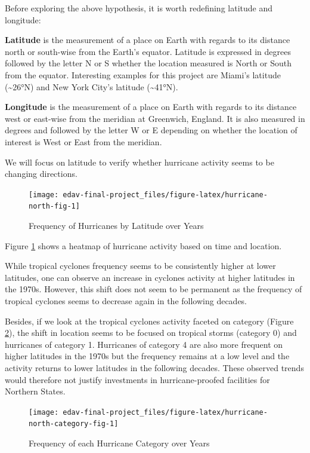 \documentclass[]{book}
\begin{document}
Before exploring the above hypothesis, it is worth redefining latitude and longitude:

\textbf{Latitude} is the measurement of a place on Earth with regards to its distance north or south-wise from the Earth's equator. Latitude is expressed in degrees followed by the letter N or S whether the location measured is North or South from the equator. Interesting examples for this project are Miami's latitude (\textasciitilde{}26°N) and New York City's latitude (\textasciitilde{}41°N).

\textbf{Longitude} is the measurement of a place on Earth with regards to its distance west or east-wise from the meridian at Greenwich, England. It is also measured in degrees and followed by the letter W or E depending on whether the location of interest is West or East from the meridian.

We will focus on latitude to verify whether hurricane activity seems to be changing directions.

\begin{figure}

{\centering \texttt{[image: edav-final-project\_files/figure-latex/hurricane-north-fig-1]} 

}

\caption{Frequency of Hurricanes by Latitude over Years}\label{fig:hurricane-north-fig}
\end{figure}

Figure \ref{fig:hurricane-north-fig} shows a heatmap of hurricane activity based on time and location.

While tropical cyclones frequency seems to be consistently higher at lower latitudes, one can observe an increase in cyclones activity at higher latitudes in the 1970s. However, this shift does not seem to be permanent as the frequency of tropical cyclones seems to decrease again in the following decades.

Besides, if we look at the tropical cyclones activity faceted on category (Figure \ref{fig:hurricane-north-category-fig}), the shift in location seems to be focused on tropical storms (category 0) and hurricanes of category 1. Hurricanes of category 4 are also more frequent on higher latitudes in the 1970s but the frequency remains at a low level and the activity returns to lower latitudes in the following decades. These observed trends would therefore not justify investments in hurricane-proofed facilities for Northern States.

\begin{figure}

{\centering \texttt{[image: edav-final-project\_files/figure-latex/hurricane-north-category-fig-1]} 

}

\caption{Frequency of each Hurricane Category over Years}\label{fig:hurricane-north-category-fig}
\end{figure}
\end{document}
